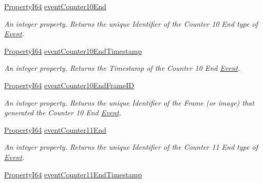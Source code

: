 \begin{DoxyCompactItemize}
\hyperlink{group___common_interface_ga81749b2696755513663492664a18a893}{Property\+I64} \hyperlink{classmv_i_m_p_a_c_t_1_1acquire_1_1_gen_i_cam_1_1_event_control_ab16c68b8130080d359047068a84225ce}{event\+Counter10\+End}
\begin{DoxyCompactList}\small\item\em An integer property. Returns the unique Identifier of the Counter 10 End type of \hyperlink{classmv_i_m_p_a_c_t_1_1acquire_1_1_event}{Event}. \end{DoxyCompactList}\item 
\hyperlink{group___common_interface_ga81749b2696755513663492664a18a893}{Property\+I64} \hyperlink{classmv_i_m_p_a_c_t_1_1acquire_1_1_gen_i_cam_1_1_event_control_a2fa2709fea9440e5abe33ea31b262148}{event\+Counter10\+End\+Timestamp}
\begin{DoxyCompactList}\small\item\em An integer property. Returns the Timestamp of the Counter 10 End \hyperlink{classmv_i_m_p_a_c_t_1_1acquire_1_1_event}{Event}. \end{DoxyCompactList}\item 
\hyperlink{group___common_interface_ga81749b2696755513663492664a18a893}{Property\+I64} \hyperlink{classmv_i_m_p_a_c_t_1_1acquire_1_1_gen_i_cam_1_1_event_control_ac9004ca6e15411020397283f2038eef4}{event\+Counter10\+End\+Frame\+I\+D}
\begin{DoxyCompactList}\small\item\em An integer property. Returns the unique Identifier of the Frame (or image) that generated the Counter 10 End \hyperlink{classmv_i_m_p_a_c_t_1_1acquire_1_1_event}{Event}. \end{DoxyCompactList}\item 
\hyperlink{group___common_interface_ga81749b2696755513663492664a18a893}{Property\+I64} \hyperlink{classmv_i_m_p_a_c_t_1_1acquire_1_1_gen_i_cam_1_1_event_control_a7a505f7c426c3c2033e7db5cde8b88b5}{event\+Counter11\+End}
\begin{DoxyCompactList}\small\item\em An integer property. Returns the unique Identifier of the Counter 11 End type of \hyperlink{classmv_i_m_p_a_c_t_1_1acquire_1_1_event}{Event}. \end{DoxyCompactList}\item 
\hyperlink{group___common_interface_ga81749b2696755513663492664a18a893}{Property\+I64} \hyperlink{classmv_i_m_p_a_c_t_1_1acquire_1_1_gen_i_cam_1_1_event_control_a6f5901c40c67adb66b1b41c82fcbc633}{event\+Counter11\+End\+Timestamp}

\end{DoxyCompactItemize}
